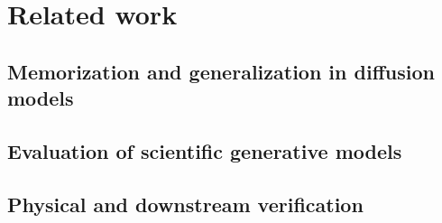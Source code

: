 \section{Related work}

\subsection{Memorization and generalization in diffusion models}

\draftplaceholder

\subsection{Evaluation of scientific generative models}

\draftplaceholder

\subsection{Physical and downstream verification}

\draftplaceholder
